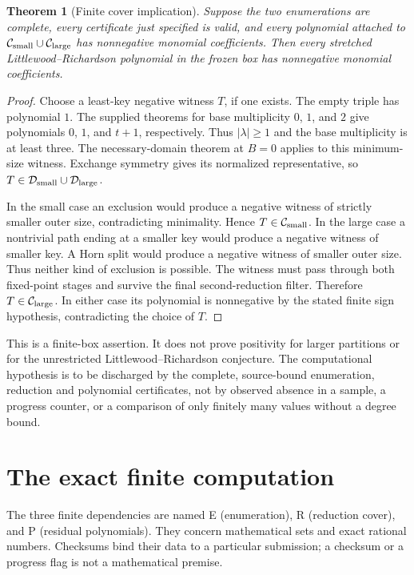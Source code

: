 \documentclass[11pt]{article}
\newtheorem{theorem}{Theorem}
\begin{document}
\begin{theorem}[Finite cover implication]\label{thm:globalcover}
Suppose the two enumerations are complete, every certificate just
specified is valid, and every polynomial attached to
$\mathcal C_{\rm small}\cup\mathcal C_{\rm large}$ has nonnegative
monomial coefficients. Then every stretched Littlewood--Richardson
polynomial in the frozen box has nonnegative monomial coefficients.
\end{theorem}
\begin{proof}
Choose a least-key negative witness $T$, if one exists.
The empty triple has polynomial $1$. The supplied theorems for base
multiplicity $0$, $1$, and $2$ give polynomials $0$, $1$, and $t+1$,
respectively. Thus $|\lambda|\ge1$ and the base multiplicity is at least three.
The necessary-domain theorem at $B=0$ applies to this minimum-size
witness. Exchange symmetry gives its normalized representative, so
$T\in\mathcal D_{\rm small}\cup\mathcal D_{\rm large}$.

In the small case an exclusion would produce a negative witness of
strictly smaller outer size, contradicting minimality. Hence
$T\in\mathcal C_{\rm small}$.
In the large case a nontrivial path ending at a smaller key would
produce a negative witness of smaller key. A Horn split would
produce a negative witness of smaller outer size. Thus neither kind
of exclusion is possible. The witness must pass through both
fixed-point stages and survive the final second-reduction filter.
Therefore $T\in\mathcal C_{\rm large}$.
In either case its polynomial is nonnegative by the stated finite
sign hypothesis, contradicting the choice of $T$.
\end{proof}

This is a finite-box assertion. It does not prove positivity for
larger partitions or for the unrestricted Littlewood--Richardson conjecture.
The computational hypothesis is to be discharged by the complete,
source-bound enumeration, reduction and polynomial certificates,
not by observed absence in a sample, a progress counter, or a
comparison of only finitely many values without a degree bound.

\section{The exact finite computation}
The three finite dependencies are named E (enumeration), R (reduction
cover), and P (residual polynomials). They concern mathematical sets and
exact rational numbers. Checksums bind their data to a particular
submission; a checksum or a progress flag is not a mathematical premise.
\end{document}
